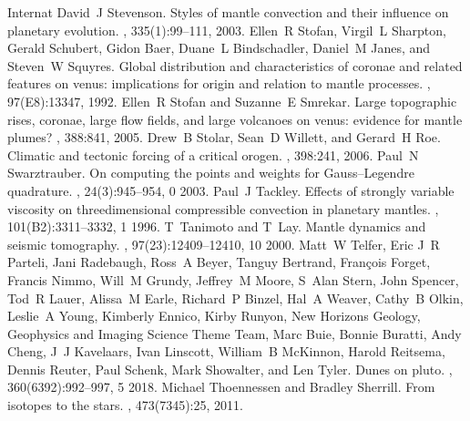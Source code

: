 \documentclass[letterpaper,10pt,english]{jupyterBook}
\begin{document}
\begin{sphinxthebibliography}{Internat}
\sphinxAtStartPar
David J Stevenson. Styles of mantle convection and their influence on planetary evolution. , 335(1):99–111, 2003.
\sphinxAtStartPar
Ellen R Stofan, Virgil L Sharpton, Gerald Schubert, Gidon Baer, Duane L Bindschadler, Daniel M Janes, and Steven W Squyres. Global distribution and characteristics of coronae and related features on venus: implications for origin and relation to mantle processes. , 97(E8):13347, 1992.
\sphinxAtStartPar
Ellen R Stofan and Suzanne E Smrekar. Large topographic rises, coronae, large flow fields, and large volcanoes on venus: evidence for mantle plumes? , 388:841, 2005.
\sphinxAtStartPar
Drew B Stolar, Sean D Willett, and Gerard H Roe. Climatic and tectonic forcing of a critical orogen. , 398:241, 2006.
\sphinxAtStartPar
Paul N Swarztrauber. On computing the points and weights for Gauss–Legendre quadrature. , 24(3):945–954, 0 2003.
\sphinxAtStartPar
Paul J Tackley. Effects of strongly variable viscosity on three\sphinxhyphen{}dimensional compressible convection in planetary mantles. , 101(B2):3311–3332, 1 1996.
\sphinxAtStartPar
T Tanimoto and T Lay. Mantle dynamics and seismic tomography. , 97(23):12409–12410, 10 2000.
\sphinxAtStartPar
Matt W Telfer, Eric J R Parteli, Jani Radebaugh, Ross A Beyer, Tanguy Bertrand, François Forget, Francis Nimmo, Will M Grundy, Jeffrey M Moore, S Alan Stern, John Spencer, Tod R Lauer, Alissa M Earle, Richard P Binzel, Hal A Weaver, Cathy B Olkin, Leslie A Young, Kimberly Ennico, Kirby Runyon, New Horizons Geology, Geophysics and Imaging Science Theme Team, Marc Buie, Bonnie Buratti, Andy Cheng, J J Kavelaars, Ivan Linscott, William B McKinnon, Harold Reitsema, Dennis Reuter, Paul Schenk, Mark Showalter, and Len Tyler. Dunes on pluto. , 360(6392):992–997, 5 2018.
\sphinxAtStartPar
Michael Thoennessen and Bradley Sherrill. From isotopes to the stars. , 473(7345):25, 2011.

\end{sphinxthebibliography}
\end{document}
